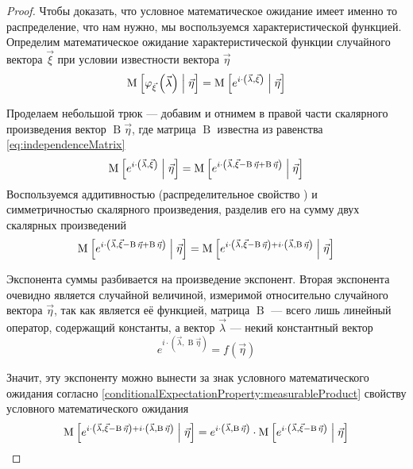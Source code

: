 \begin{proof}
  Чтобы доказать, что условное математическое ожидание имеет именно то
  распределение, что нам нужно, мы воспользуемся характеристической функцией.
  Определим математическое ожидание характеристической функции случайного
  вектора $\vec{\xi}$ при условии известности вектора $\vec{\eta}$
  $$\operatorname{M}_{} \left[ \varphi_{\vec{\xi}}\left( \vec{\lambda} \right) \;\middle|\; \vec{\eta} \right]
      = \operatorname{M}_{} \left[ e^{i \cdot \left( \vec{\lambda}, \vec{\xi} \right)}
      \;\middle|\; \vec{\eta} \right]$$

  Проделаем небольшой трюк --- добавим и отнимем в правой части скалярного
  произведения вектор $\operatorname{B} \vec{\eta}$, где матрица
  $\operatorname{B}$ известна из равенства \eqref{eq:independenceMatrix}
  $$\operatorname{M}_{} \left[ e^{i \cdot \left( \vec{\lambda}, \vec{\xi} \right)}
      \;\middle|\; \vec{\eta} \right]
      = \operatorname{M}_{} \left[ e^{i \cdot \left( \vec{\lambda},
          \vec{\xi} - \operatorname{B} \vec{\eta}
        + \operatorname{B} \vec{\eta} \right)}
      \;\middle|\; \vec{\eta} \right]$$
  Воспользуемся аддитивностью (распределительное свойство
  \cite[с.~82]{VoevodinLA}) и симметричностью скалярного произведения,
  разделив его на сумму двух скалярных произведений
  $$\operatorname{M}_{} \left[ e^{i \cdot \left( \vec{\lambda},
      \vec{\xi} - \operatorname{B} \vec{\eta}
          + \operatorname{B} \vec{\eta} \right)}
      \;\middle|\; \vec{\eta} \right]
      = \operatorname{M}_{} \left[ e^{i \cdot \left( \vec{\lambda},
          \vec{\xi} - \operatorname{B} \vec{\eta} \right)
        + i \cdot \left( \vec{\lambda},
            \operatorname{B} \vec{\eta} \right)}
      \;\middle|\; \vec{\eta} \right]$$

  Экспонента суммы разбивается на произведение экспонент. Вторая экспонента
  очевидно является случайной величиной, измеримой относительно случайного
  вектора $\vec{\eta}$, так как является её функцией, матрица
  $\operatorname{B}$ --- всего лишь линейный оператор, содержащий константы,
  а вектор $\vec{\lambda}$ --- некий константный вектор
  $$e^{i \cdot \left( \vec{\lambda}, \operatorname{B} \vec{\eta} \right)}
      = f\left( \vec{\eta} \right)$$

  Значит, эту экспоненту можно вынести за знак условного математического
  ожидания согласно \ref{conditionalExpectationProperty:measurableProduct}
  свойству условного математического ожидания
  $$\operatorname{M}_{} \left[ e^{i \cdot \left( \vec{\lambda},
          \vec{\xi} - \operatorname{B} \vec{\eta} \right)
        + i \cdot \left( \vec{\lambda},
            \operatorname{B} \vec{\eta} \right)}
      \;\middle|\; \vec{\eta} \right]
      = e^{i \cdot \left( \vec{\lambda}, \operatorname{B} \vec{\eta} \right)}
          \cdot \operatorname{M}_{} \left[ e^{i \cdot \left( \vec{\lambda},
        \vec{\xi} - \operatorname{B} \vec{\eta} \right)}
          \;\middle|\; \vec{\eta} \right]$$


\end{proof}
